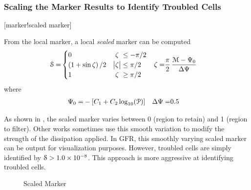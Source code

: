 \subsubsection{Scaling the Marker Results to Identify Troubled Cells}
\label{SEC:ScaledMarker}
\key*{}[marker!scaled marker]


From the local marker, a local {\em scaled} marker can be computed
\begin{align}
    \label{EQN:ScaledResolutionMarker}
    {\cal S}
 =& \begin{cases}
      0                                  &
      \phantom{\bigl|} \zeta \phantom{\bigr|} \leq -\pi/2
 \\
      \left( 1 + \sin \zeta \right) / 2  & 
               \bigl|  \zeta          \bigr|  \leq  \pi/2
 \\
      1                                  & 
      \phantom{\bigl|} \zeta \phantom{\bigr|} \geq  \pi/2
    \end{cases}
  & 
    \zeta
 =& \frac{\pi}{2} \, \frac{ {\cal M} - \Psi_0 }{ \Delta \Psi }
\end{align}
where
\begin{align}
    \Psi_0 =& -\left[ C_1 + C_2 \log_{10} ({\cal P}) \right]
  & \Delta \Psi =& 0.5
\end{align}


As shown in , the scaled marker varies between
0 (region to retain) and 1 (region to filter).
%
Other works sometimes use this smooth variation to modify the
strength of the dissipation applied.
%
In GFR, this smoothly varying scaled marker can be output for
visualization purposes.
%
However, troubled cells are simply identified by
${\cal S} > \scinum{1.0}{-8}$.
%
This approach is more aggressive at identifying troubled cells.


\begin{figure}
  \begin{centering}
    \caption{Scaled Marker}
    \label{FIG:Scaled_Marker}
  \end{centering}
\end{figure}

